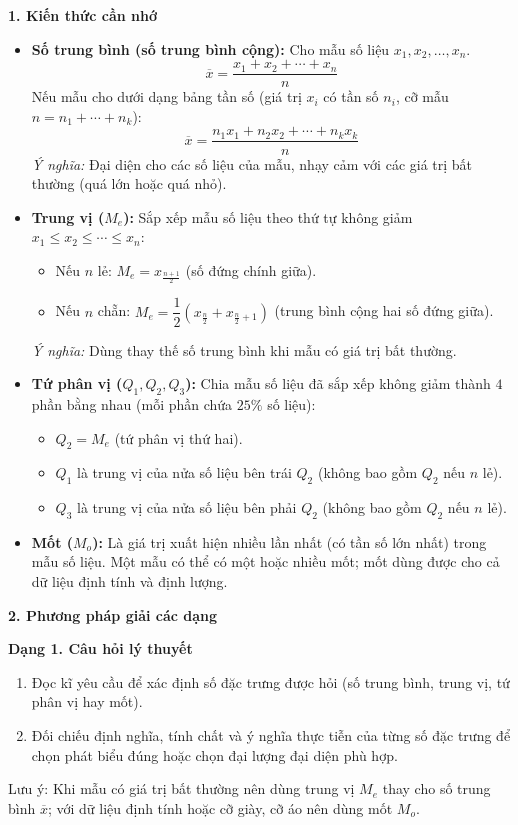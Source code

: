 \textbf{1. Kiến thức cần nhớ}
\begin{itemize}
\item \textbf{Số trung bình (số trung bình cộng):} Cho mẫu số liệu $x_1, x_2, \ldots, x_n$.
\[ \boxed{\overline{x} = \dfrac{x_1 + x_2 + \cdots + x_n}{n}} \]
Nếu mẫu cho dưới dạng bảng tần số (giá trị $x_i$ có tần số $n_i$, cỡ mẫu $n = n_1 + \cdots + n_k$):
\[ \boxed{\overline{x} = \dfrac{n_1 x_1 + n_2 x_2 + \cdots + n_k x_k}{n}} \]
\textit{Ý nghĩa:} Đại diện cho các số liệu của mẫu, nhạy cảm với các giá trị bất thường (quá lớn hoặc quá nhỏ).
\item \textbf{Trung vị ($M_e$):} Sắp xếp mẫu số liệu theo thứ tự không giảm $x_1 \le x_2 \le \cdots \le x_n$:
\begin{itemize}
\item Nếu $n$ lẻ: $\boxed{M_e = x_{\frac{n+1}{2}}}$ (số đứng chính giữa).
\item Nếu $n$ chẵn: $\boxed{M_e = \dfrac{1}{2}\left(x_{\frac{n}{2}} + x_{\frac{n}{2}+1}\right)}$ (trung bình cộng hai số đứng giữa).
\end{itemize}
\textit{Ý nghĩa:} Dùng thay thế số trung bình khi mẫu có giá trị bất thường.
\item \textbf{Tứ phân vị ($Q_1, Q_2, Q_3$):} Chia mẫu số liệu đã sắp xếp không giảm thành $4$ phần bằng nhau (mỗi phần chứa $25\%$ số liệu):
\begin{itemize}
\item $Q_2 = M_e$ (tứ phân vị thứ hai).
\item $Q_1$ là trung vị của nửa số liệu bên trái $Q_2$ (không bao gồm $Q_2$ nếu $n$ lẻ).
\item $Q_3$ là trung vị của nửa số liệu bên phải $Q_2$ (không bao gồm $Q_2$ nếu $n$ lẻ).
\end{itemize}
\item \textbf{Mốt ($M_o$):} Là giá trị xuất hiện nhiều lần nhất (có tần số lớn nhất) trong mẫu số liệu. Một mẫu có thể có một hoặc nhiều mốt; mốt dùng được cho cả dữ liệu định tính và định lượng.
\end{itemize}

\textbf{2. Phương pháp giải các dạng}

\textbf{Dạng 1. Câu hỏi lý thuyết}
\begin{enumerate}
\item Đọc kĩ yêu cầu để xác định số đặc trưng được hỏi (số trung bình, trung vị, tứ phân vị hay mốt).
\item Đối chiếu định nghĩa, tính chất và ý nghĩa thực tiễn của từng số đặc trưng để chọn phát biểu đúng hoặc chọn đại lượng đại diện phù hợp.
\end{enumerate}
Lưu ý: Khi mẫu có giá trị bất thường nên dùng trung vị $M_e$ thay cho số trung bình $\overline{x}$; với dữ liệu định tính hoặc cỡ giày, cỡ áo nên dùng mốt $M_o$.


